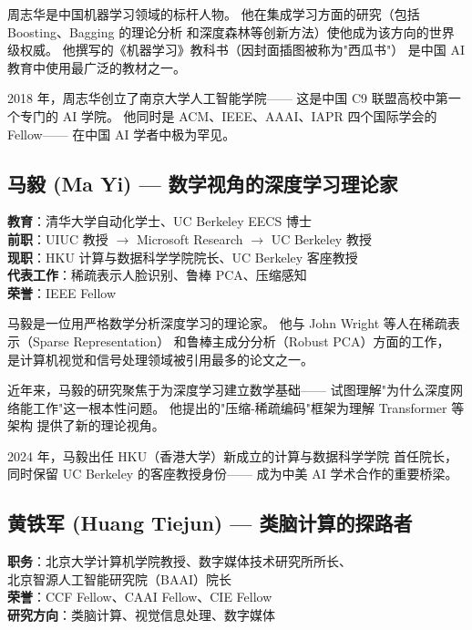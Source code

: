 周志华是中国机器学习领域的标杆人物。
他在集成学习方面的研究（包括 Boosting、Bagging 的理论分析
和深度森林等创新方法）使他成为该方向的世界级权威。
他撰写的《机器学习》教科书（因封面插图被称为"西瓜书"）
是中国 AI 教育中使用最广泛的教材之一。

2018 年，周志华创立了南京大学人工智能学院——
这是中国 C9 联盟高校中第一个专门的 AI 学院。
他同时是 ACM、IEEE、AAAI、IAPR 四个国际学会的 Fellow——
在中国 AI 学者中极为罕见。


\subsection{马毅 (Ma Yi) — 数学视角的深度学习理论家}

\begin{keybox}[人物档案：马毅]
\textbf{教育}：清华大学自动化学士、UC Berkeley EECS 博士 \\
\textbf{前职}：UIUC 教授 $\to$ Microsoft Research $\to$ UC Berkeley 教授 \\
\textbf{现职}：HKU 计算与数据科学学院院长、UC Berkeley 客座教授 \\
\textbf{代表工作}：稀疏表示人脸识别、鲁棒 PCA、压缩感知 \\
\textbf{荣誉}：IEEE Fellow
\end{keybox}

马毅是一位用严格数学分析深度学习的理论家。
他与 John Wright 等人在稀疏表示（Sparse Representation）
和鲁棒主成分分析（Robust PCA）方面的工作，
是计算机视觉和信号处理领域被引用最多的论文之一。

近年来，马毅的研究聚焦于为深度学习建立数学基础——
试图理解"为什么深度网络能工作"这一根本性问题。
他提出的"压缩-稀疏编码"框架为理解 Transformer 等架构
提供了新的理论视角。

2024 年，马毅出任 HKU（香港大学）新成立的计算与数据科学学院
首任院长，同时保留 UC Berkeley 的客座教授身份——
成为中美 AI 学术合作的重要桥梁。


\subsection{黄铁军 (Huang Tiejun) — 类脑计算的探路者}

\begin{keybox}
\textbf{职务}：北京大学计算机学院教授、数字媒体技术研究所所长、\\
\quad 北京智源人工智能研究院（BAAI）院长 \\
\textbf{荣誉}：CCF Fellow、CAAI Fellow、CIE Fellow \\
\textbf{研究方向}：类脑计算、视觉信息处理、数字媒体
\end{keybox}

